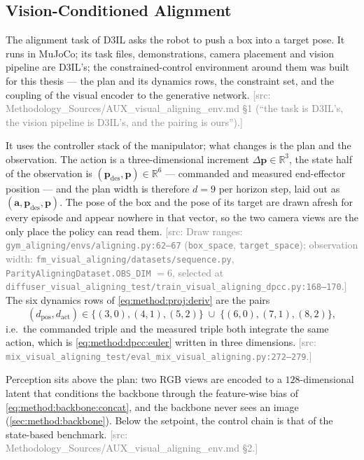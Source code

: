 \documentclass[headsepline,footsepline,footinclude=false,oneside,fontsize=11pt,paper=a4,listof=totoc,bibliography=totoc]{scrbook}
\theoremstyle{definition}
\theoremstyle{plain}
\theoremstyle{remark}
\newcommand{\vect}[1]{\boldsymbol{#1}}
\newcommand{\sidx}[1]{_{\textrm{#1}}}
\newcommand{\R}{\mathbb{R}}                    %
\newif\ifsubmission
\newcommand{\srcnote}[1]{\ifsubmission\else\textcolor{gray}{\footnotesize\textsf{[src: #1]}}\fi}
\begin{document}
\subsection{Vision-Conditioned Alignment}\label{sec:method:env:aligning}

The alignment task of D3IL \parencite{jia2024towards} asks the robot to push a box into a target
pose. It runs in MuJoCo; its task files, demonstrations, camera placement and vision pipeline are
D3IL's; the constrained-control environment
around them was built for this thesis --- the plan and its dynamics rows, the constraint set, and the
coupling of the visual encoder to the generative network.
\srcnote{Methodology\_Sources/AUX\_visual\_aligning\_env.md \S1 (``the task is D3IL's, the vision
pipeline is D3IL's, and the pairing is ours'').}

It uses the controller stack of the manipulator; what changes is the plan and the observation. The action is a three-dimensional increment $\Delta\vect{p}\in\R^{3}$, the state
half of the observation is $(\vect{p}\sidx{des},\vect{p})\in\R^{6}$ --- commanded and measured
end-effector position --- and the plan width is therefore $d = 9$ per horizon step, laid out as
$(\vect{a},\vect{p}\sidx{des},\vect{p})$. The pose of the box and the pose of its target are drawn
afresh for every episode and appear nowhere in that vector, so the two camera views are the only
place the policy can read them.
\srcnote{Draw ranges: \texttt{gym\_aligning/envs/aligning.py:62--67} (\texttt{box\_space},
\texttt{target\_space}); observation width:
\texttt{fm\_visual\_aligning/datasets/sequence.py}, \texttt{ParityAligningDataset.OBS\_DIM}
$=6$, selected at
\texttt{diffuser\_visual\_aligning\_test/train\_visual\_aligning\_dpcc.py:168--170}.} The six dynamics rows of
\eqref{eq:method:proj:deriv} are the pairs
\begin{equation}\label{eq:method:dep:varows}
  \left(d\sidx{pos},d\sidx{act}\right) \in
  \{(3,0),(4,1),(5,2)\}\;\cup\;\{(6,0),(7,1),(8,2)\},
\end{equation}
i.e.\ the commanded triple and the measured triple both integrate the same action, which is
\eqref{eq:method:dpcc:euler} written in three dimensions.
\srcnote{\texttt{mix\_visual\_aligning\_test/eval\_mix\_visual\_aligning.py:272--279}.}

Perception sits above the plan: two RGB views are encoded to a $128$-dimensional latent that
conditions the backbone through the feature-wise bias of \eqref{eq:method:backbone:concat}, and the
backbone never sees an image (\autoref{sec:method:backbone}). Below the setpoint, the control chain is
that of the state-based benchmark.
\srcnote{Methodology\_Sources/AUX\_visual\_aligning\_env.md \S2.}
\end{document}
